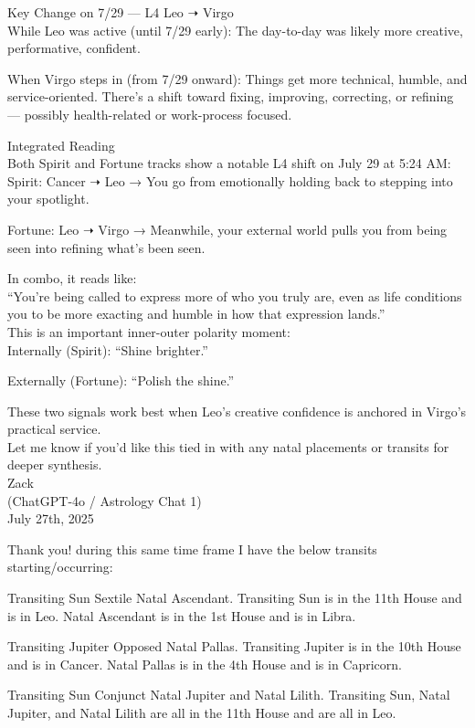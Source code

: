 \documentclass{article}
\begin{document}
Key Change on 7/29 --- L4 Leo ➝ Virgo\\
While Leo was active (until 7/29 early): The day-to-day was likely more
creative, performative, confident.

When Virgo steps in (from 7/29 onward): Things get more technical,
humble, and service-oriented. There's a shift toward fixing, improving,
correcting, or refining --- possibly health-related or work-process
focused.

 Integrated Reading\\
Both Spirit and Fortune tracks show a notable L4 shift on July 29 at
5:24 AM:\\
Spirit: Cancer ➝ Leo → You go from emotionally holding back to stepping
into your spotlight.

Fortune: Leo ➝ Virgo → Meanwhile, your external world pulls you from
being seen into refining what's been seen.

 In combo, it reads like:\\
``You're being called to express more of who you truly are, even as life
conditions you to be more exacting and humble in how that expression
lands.''\\
This is an important inner-outer polarity moment:\\
Internally (Spirit): ``Shine brighter.''

Externally (Fortune): ``Polish the shine.''

These two signals work best when Leo's creative confidence is anchored
in Virgo's practical service.\\
Let me know if you'd like this tied in with any natal placements or
transits for deeper synthesis.\\
Zack\\
(ChatGPT-4o / Astrology Chat 1)\\
July 27th, 2025

Thank you! during this same time frame I have the below transits
starting/occurring:

Transiting Sun Sextile Natal Ascendant. Transiting Sun is in the 11th
House and is in Leo. Natal Ascendant is in the 1st House and is in
Libra.

Transiting Jupiter Opposed Natal Pallas. Transiting Jupiter is in the
10th House and is in Cancer. Natal Pallas is in the 4th House and is in
Capricorn.

Transiting Sun Conjunct Natal Jupiter and Natal Lilith. Transiting Sun,
Natal Jupiter, and Natal Lilith are all in the 11th House and are all in
Leo.
\end{document}
